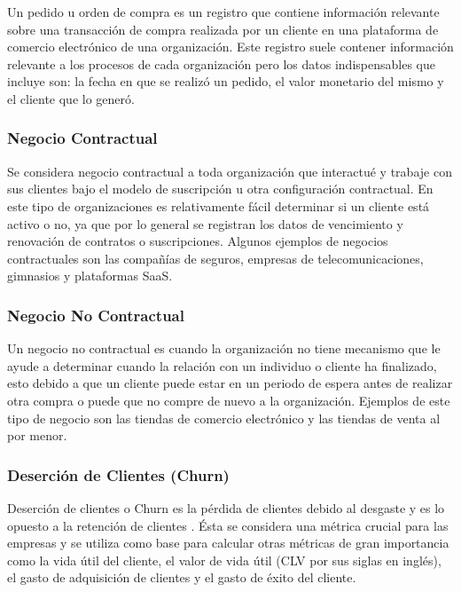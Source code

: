 Un pedido u orden de compra es un registro que contiene información relevante sobre una transacción de compra realizada por un cliente en una plataforma de comercio electrónico de una organización. Este registro suele contener información relevante a los procesos de cada organización pero los datos indispensables que incluye son: la fecha en que se realizó un pedido, el valor monetario del mismo y el cliente que lo generó.

\subsubsection{Negocio Contractual}

Se considera negocio contractual a toda organización que interactué y trabaje con sus clientes bajo el modelo de suscripción u otra configuración contractual. En este tipo de organizaciones es relativamente fácil determinar si un cliente está activo o no, ya que por lo general se registran los datos de vencimiento y renovación de contratos o suscripciones. Algunos ejemplos de negocios contractuales son las compañías de seguros, empresas de telecomunicaciones, gimnasios y plataformas SaaS.

\subsubsection{Negocio No Contractual}

Un negocio no contractual es cuando la organización no tiene mecanismo que le ayude a determinar cuando la relación con un individuo o cliente ha finalizado, esto debido a que un cliente puede estar en un periodo de espera antes de realizar otra compra o puede que no compre de nuevo a la organización. Ejemplos de este tipo de negocio son las tiendas de comercio electrónico y las tiendas de venta al por menor.

\subsubsection{Deserción de Clientes (Churn)}

Deserción de clientes o Churn es la pérdida de clientes debido al desgaste y es lo opuesto a la retención de clientes \cite{gold2020}. Ésta se considera una métrica crucial para las empresas y se utiliza como base para calcular otras métricas de gran importancia como la vida útil del cliente, el valor de vida útil (CLV por sus siglas en inglés), el gasto de adquisición de clientes y el gasto de éxito del cliente.

